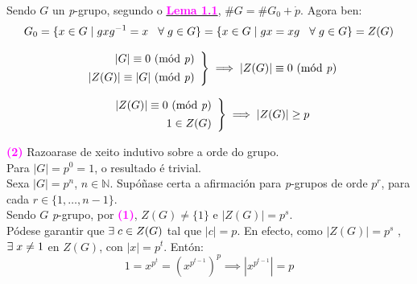 \documentclass[twoside]{report}
\newcommand{\magbf}[1]{\textcolor{magenta}{\textbf{#1}}} %
\theoremstyle{mystyle}
\begin{document}
\noindent Sendo $G$ un \textit{p}-grupo, segundo o \hyperref[lem1.1]{\magbf{Lema 1.1}}, $\#G = \#G_{0} + \dot{p}$. Agora ben:
$$G_{0} = \{x \in G \hspace{1mm} | \hspace{1mm} gxg^{-1} = x \hspace{3mm} \forall \hspace{1mm} g \in G\} = \{x \in G \hspace{1mm} | \hspace{1mm} gx = xg \hspace{3mm} \forall \hspace{1mm} g \in G\} = Z(G)$$

    \[ 
    \left. \begin{array}{r} 
    |G| \equiv 0 \text{ (mód \textit{p})} \\[1ex]
    |Z(G)| \equiv |G| \text{ (mód \textit{p})}
    \end{array} \right\} 
    \implies |Z(G)| \equiv 0 \text{ (mód \textit{p})}\\
    \]
    
\vspace{5mm}
    
    \[ 
    \left. \begin{array}{r} 
    |Z(G)| \equiv 0 \text{ (mód \textit{p})} \\[1ex]
    1 \in Z(G)
    \end{array} \right\} 
    \implies |Z(G)| \geq p\\
    \]
    
\vspace{5mm}

\noindent \magbf{(2)} Razoarase de xeito indutivo sobre a orde do grupo.\\

\noindent Para $|G| = p^{0} = 1$, o resultado é trivial.\\

\noindent Sexa $|G| = p^{n}$,  $n \in \mathbb{N}$. Supóñase certa a afirmación para \textit{p}-grupos de orde $p^{r}$, para cada $r \in \{1, \dots, n-1\}$. \\

\noindent Sendo $G$ \textit{p}-grupo, por \magbf{(1)}, $Z(G) \neq \{1\}$ e $|Z(G)| = p^{s}$.\\

\noindent Pódese garantir que $\exists \hspace{1mm} c \in Z(G)$ tal que $|c| = p$. En efecto, como $|Z(G)| = p^{s}$
, $\exists \hspace{1mm} x \neq 1$ en $Z(G)$, con $|x| = p^{t}$. Entón:
$$1 = x^{p^{t}} = (x^{p^{t-1}})^{p} \implies |x^{p^{t-1}}| = p$$
\end{document}

